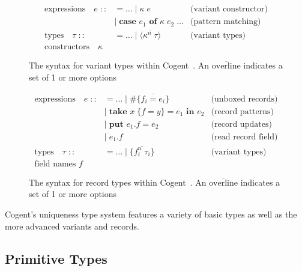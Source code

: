 \begin{figure}
    \centering

    \begin{align*}
        \text{expressions}\quad e\; 
            ::&= \dots\; |\; \kappa\; e & \text{(variant constructor)} \\
              &|\; \textbf{case } e_1 \textbf{ of } \kappa\; e_2\; \dots & \text{(pattern matching)} \\
        \text{types}\quad \tau\;
            ::&= \dots\; |\; \langle \overline{\kappa^n\; \tau} \rangle & \text{(variant types)} \\
        \text{constructors}\quad \kappa
    \end{align*}

    \caption{The syntax for variant types within Cogent~\citep{ICFPCogent}. An $\overline{\text{overline}}$ indicates a set of 1 or more options}
    \label{fig:variantGrammar}
\end{figure}

\begin{figure}
    \centering
    \begin{align*}
        \text{expressions}\quad e\; 
            ::&= \dots\; |\; \#\{\overline{f_i = e_i}\} & \text{(unboxed records)} \\
              &|\; \textbf{take } x\; \{ f = y\} = e_1 \textbf{ in } e_2 & \text{(record patterns)} \\
              &|\; \textbf{put } e_1.f = e_2 & \text{(record updates)} \\
              &|\; e_1.f & \text{(read record field)} \\
        \text{types}\quad \tau\;
            ::&= \dots\; |\; \{ \overline{f_i^n\; \tau_i} \} & \text{(variant types)} \\
        \text{field names } f
    \end{align*}
    \caption{The syntax for record types within Cogent~\citep{ICFPCogent}. An $\overline{\text{overline}}$ indicates a set of 1 or more options}
    \label{fig:recordGrammar}
\end{figure}



Cogent's uniqueness type system features a variety of basic types as well as the more advanced variants
and records.

\subsection{Primitive Types}

